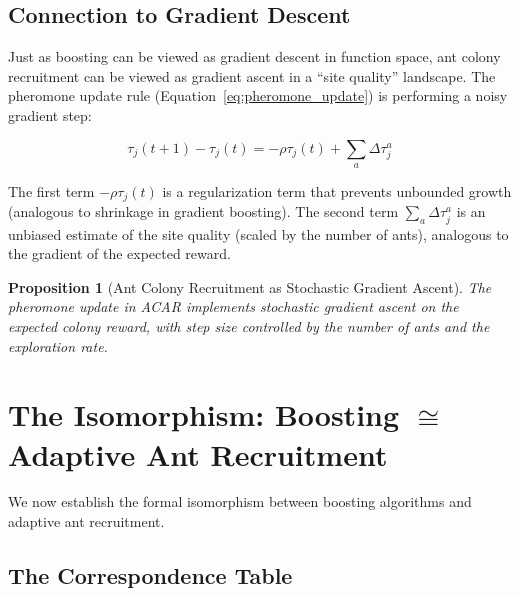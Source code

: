 \documentclass[12pt,letterpaper]{article}
\newtheorem{proposition}[theorem]{Proposition}
\begin{document}
\subsection{Connection to Gradient Descent}

Just as boosting can be viewed as gradient descent in function space, ant colony recruitment can be viewed as gradient ascent in a ``site quality'' landscape. The pheromone update rule (Equation~\ref{eq:pheromone_update}) is performing a noisy gradient step:

\begin{equation}
\tau_j(t+1) - \tau_j(t) = -\rho \tau_j(t) + \sum_a \Delta \tau_j^a
\end{equation}

The first term $-\rho \tau_j(t)$ is a regularization term that prevents unbounded growth (analogous to shrinkage in gradient boosting). The second term $\sum_a \Delta \tau_j^a$ is an unbiased estimate of the site quality (scaled by the number of ants), analogous to the gradient of the expected reward.

\begin{proposition}[Ant Colony Recruitment as Stochastic Gradient Ascent]
The pheromone update in ACAR implements stochastic gradient ascent on the expected colony reward, with step size controlled by the number of ants and the exploration rate.
\end{proposition}

\section{The Isomorphism: Boosting \texorpdfstring{$\cong$}{is congruent to} Adaptive Ant Recruitment}

We now establish the formal isomorphism between boosting algorithms and adaptive ant recruitment.

\subsection{The Correspondence Table}
\end{document}
